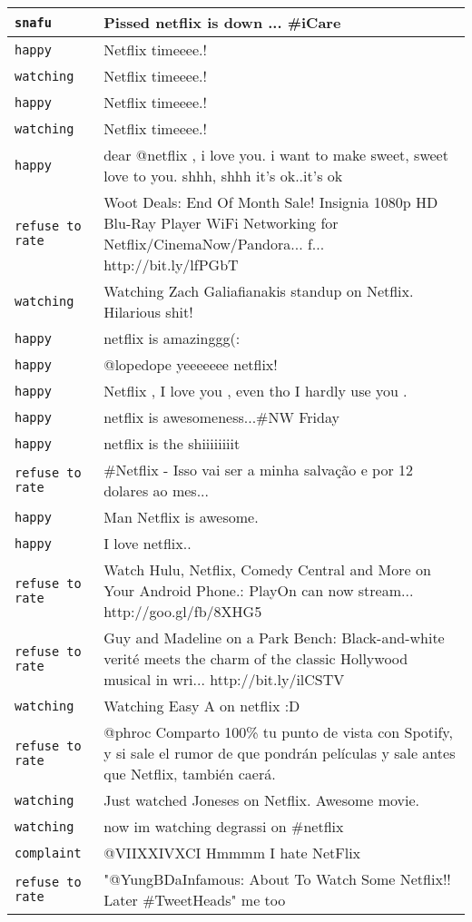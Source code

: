 \begin{center}
\begin{longtable}{|l|p{120mm}|}
      \tabularnewline\hline
         \texttt{snafu} & Pissed netflix is down ... \#iCare
      \tabularnewline\hline
         \texttt{happy} & Netflix timeeee.!
      \tabularnewline\hline
         \texttt{watching} & Netflix timeeee.!
      \tabularnewline\hline
         \texttt{happy} & Netflix timeeee.!
      \tabularnewline\hline
         \texttt{watching} & Netflix timeeee.!
      \tabularnewline\hline
         \texttt{happy} & dear @netflix , i love you. i want to make sweet, sweet love to you. shhh, shhh it's ok..it's ok
      \tabularnewline\hline
         \texttt{refuse to rate} & Woot Deals: End Of Month Sale! Insignia 1080p HD Blu-Ray Player WiFi Networking for Netflix/CinemaNow/Pandora... f... http://bit.ly/lfPGbT
      \tabularnewline\hline
         \texttt{watching} & Watching Zach Galiafianakis standup on Netflix. Hilarious shit!
      \tabularnewline\hline
         \texttt{happy} & netflix is amazinggg(:
      \tabularnewline\hline
         \texttt{happy} & @lopedope yeeeeeee netflix!
      \tabularnewline\hline
         \texttt{happy} & Netflix , I love you , even tho I hardly use you .
      \tabularnewline\hline
         \texttt{happy} & netflix is awesomeness...\#NW Friday
      \tabularnewline\hline
         \texttt{happy} & netflix is the shiiiiiiiit
      \tabularnewline\hline
         \texttt{refuse to rate} & \#Netflix - Isso vai ser a minha salvação e por 12 dolares ao mes...
      \tabularnewline\hline
         \texttt{happy} & Man Netflix is awesome.
      \tabularnewline\hline
         \texttt{happy} & I love netflix..
      \tabularnewline\hline
         \texttt{refuse to rate} & Watch Hulu, Netflix, Comedy Central and More on Your Android Phone.: PlayOn can now stream... http://goo.gl/fb/8XHG5
      \tabularnewline\hline
         \texttt{refuse to rate} & Guy and Madeline on a Park Bench: Black-and-white verité meets the charm of the classic Hollywood musical in wri... http://bit.ly/ilCSTV
      \tabularnewline\hline
         \texttt{watching} & Watching Easy A on netflix :D
      \tabularnewline\hline
         \texttt{refuse to rate} & @phroc Comparto 100\% tu punto de vista con Spotify, y si sale el rumor de que pondrán películas y sale antes que Netflix, también caerá.
      \tabularnewline\hline
         \texttt{watching} & Just watched Joneses on Netflix. Awesome movie.
      \tabularnewline\hline
         \texttt{watching} & now im watching degrassi on \#netflix
      \tabularnewline\hline
         \texttt{complaint} & @VIIXXIVXCI Hmmmm I hate NetFlix
      \tabularnewline\hline
         \texttt{refuse to rate} & "@YungBDaInfamous: About To Watch Some Netflix!! Later \#TweetHeads" me too

\end{longtable}
\end{center}
